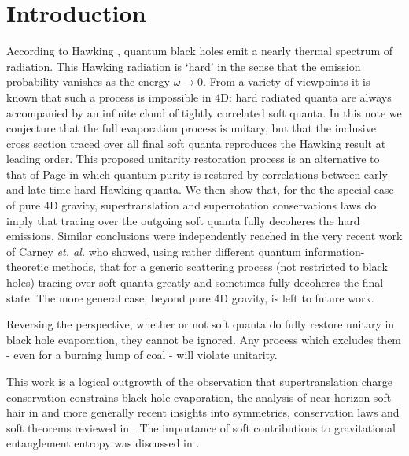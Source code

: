 \documentclass[12pt]{article}
\numberwithin{equation}{section}
\begin{document}
\newpage

\section{Introduction}
According to Hawking \cite{Hawking:1974sw}, quantum black holes emit a nearly thermal spectrum of radiation. This Hawking radiation is `hard' in the sense that the emission probability vanishes as the energy $ \omega \to 0$. From a variety of viewpoints it is known that such a process is impossible in 4D: hard radiated quanta are always accompanied by an infinite cloud of tightly correlated soft quanta. In this note we conjecture that the full evaporation process is unitary, but that the inclusive cross section 
traced over all final soft quanta reproduces the Hawking result at leading order. This proposed unitarity restoration process is an alternative to that of Page \cite{Page:1979tc} in which quantum purity  is restored by correlations between early and late time hard Hawking quanta. We then show that, for the the special case of pure 4D gravity, supertranslation and superrotation conservations laws do imply that tracing over the outgoing soft quanta fully decoheres  the  hard emissions.  Similar conclusions were independently reached in the very recent work of 
Carney {\it et. al.} \cite{Carney:2017jut} who showed, using rather different quantum information-theoretic  methods,  that for  a generic scattering process (not restricted to black holes) tracing over soft quanta greatly and sometimes fully decoheres the final state. The more general case, beyond pure 4D gravity, is left to future work. 

Reversing  the perspective, whether or not soft quanta do fully restore unitary in black hole evaporation, they cannot be ignored. Any process which excludes them - even for a burning lump of coal - will violate unitarity. 


This work is a logical outgrowth of the observation \cite{Strominger:2014pwa} that supertranslation charge conservation constrains black hole evaporation,  the analysis of near-horizon soft hair in \cite{hps,Hawking:2016sgy}  and more generally recent insights into symmetries, conservation laws and soft theorems reviewed in \cite{Strominger:2017zoo}. The importance of soft contributions to gravitational entanglement entropy was discussed in \cite{Kapec:2016aqd}. 
\end{document}
